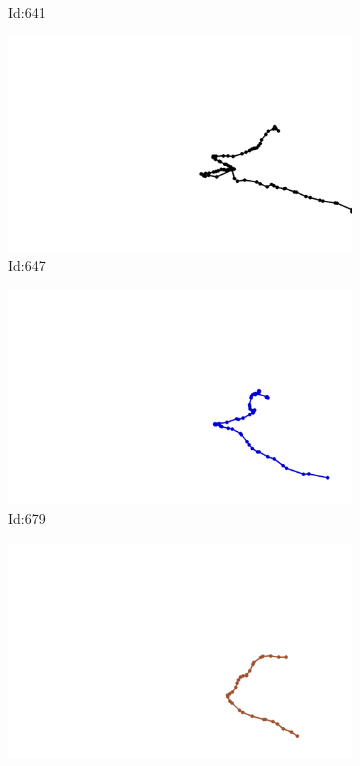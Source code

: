 \documentclass[12pt,twoside]{report}
\begin{document}
\begin{figure}
\begin{subfigure}[b]{0.20\textwidth}
\caption{Id:641}
\end{subfigure}
\begin{subfigure}[b]{0.20\textwidth}
\centering
\includegraphics[width=\textwidth]{../trajectories/647.png}
\caption{Id:647}
\end{subfigure}
\begin{subfigure}[b]{0.20\textwidth}
\centering
\includegraphics[width=\textwidth]{../trajectories/679.png}
\caption{Id:679}
\end{subfigure}
\begin{subfigure}[b]{0.20\textwidth}
\centering
\includegraphics[width=\textwidth]{../trajectories/712.png}

\end{subfigure}
\end{figure}
\end{document}
